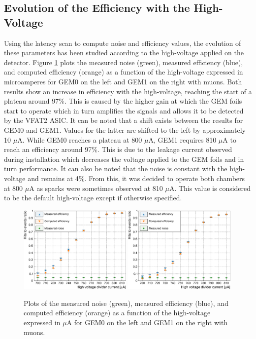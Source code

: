     \subsection{Evolution of the Efficiency with the High-Voltage}

      Using the latency scan to compute noise and efficiency values, the evolution of these parameters has been studied according to the high-voltage applied on the detector. Figure \ref{fig:II-3-data-eff-hv} plots the measured noise (green), measured efficiency (blue), and computed efficiency (orange) as a function of the high-voltage expressed in microamperes for GEM0 on the left and GEM1 on the right with muons. Both results show an increase in efficiency with the high-voltage, reaching the start of a plateau around 97\%. This is caused by the higher gain at which the GEM foils start to operate which in turn amplifies the signals and allows it to be detected by the VFAT2 ASIC. It can be noted that a shift exists between the results for GEM0 and GEM1. Values for the latter are shifted to the left by approximately 10 $\mu$A. While GEM0 reaches a plateau at 800 $\mu$A, GEM1 requires 810 $\mu$A to reach an efficiency around 97\%. This is due to the leakage current observed during installation which decreases the voltage applied to the GEM foils and in turn performance. It can also be noted that the noise is constant with the high-voltage and remains at 4\%. From this, it was decided to operate both chambers at 800 $\mu$A as sparks were sometimes observed at 810 $\mu$A. This value is considered to be the default high-voltage except if otherwise specified. \\

      \begin{figure}[h!]
        \centering
        \includegraphics[width=0.49\textwidth]{img/plots/cEfficiency_HV_GEM0-crop}
        \includegraphics[width=0.49\textwidth]{img/plots/cEfficiency_HV_GEM1-crop}
        \caption{Plots of the measured noise (green), measured efficiency (blue), and computed efficiency (orange) as a function of the high-voltage expressed in $\mu$A for GEM0 on the left and GEM1 on the right with muons.}
        \label{fig:II-3-data-eff-hv}
      \end{figure}


